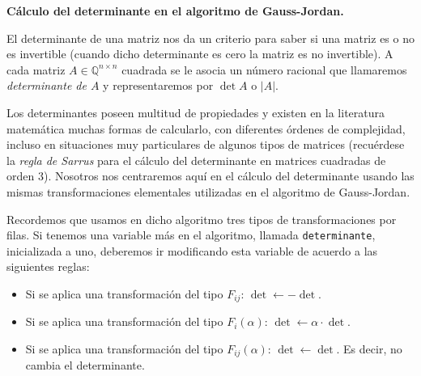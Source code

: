 \documentclass[a4paper,10pt]{article}
\newcommand{\M}[3]{#1 \in \mathbb{Q}^{#2 \times #3}}
\begin{document}
\par \vspace{14pt}

\textbf{Cálculo del determinante en el algoritmo de Gauss-Jordan.}

\par \vspace{10pt}

El determinante de una matriz nos da un criterio para saber si una matriz es o no es invertible (cuando dicho determinante es cero la matriz es no invertible). A cada matriz $\M{A}{n}{n}$ cuadrada se le asocia un número racional que llamaremos \emph{determinante de $A$} y representaremos por $\det A$ o $|A|$.

\par \vspace{10pt}

Los determinantes poseen multitud de propiedades y existen en la literatura matemática muchas formas de calcularlo, con diferentes órdenes de complejidad, incluso en situaciones muy particulares de algunos tipos de matrices (recuérdese la \emph{regla de Sarrus} para el cálculo del determinante en matrices cuadradas de orden 3). Nosotros nos centraremos aquí en el cálculo del determinante usando las mismas transformaciones elementales utilizadas en el algoritmo de Gauss-Jordan.

\par \vspace{10pt}

Recordemos que usamos en dicho algoritmo tres tipos de transformaciones por filas. Si tenemos una variable más en el algoritmo, llamada \texttt{determinante}, inicializada a uno, deberemos ir modificando esta variable de acuerdo a las siguientes reglas:

\par \vspace{10pt}

\begin{itemize}
	\item Si se aplica una transformación del tipo $F_{ij}$: $\det \leftarrow -\det$.
	\item Si se aplica una transformación del tipo $F_{i}(\alpha)$: $\det \leftarrow \alpha\cdot\det$.
	\item Si se aplica una transformación del tipo $F_{ij}(\alpha)$: $\det \leftarrow \det$. Es decir, no cambia el determinante.
\end{itemize}

\par \vspace{10pt}
\end{document}
